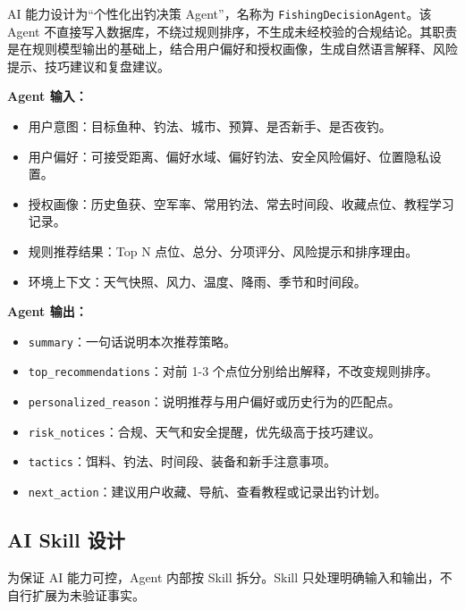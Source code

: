 AI 能力设计为“个性化出钓决策 Agent”，名称为 \texttt{FishingDecisionAgent}。该 Agent 不直接写入数据库，不绕过规则排序，不生成未经校验的合规结论。其职责是在规则模型输出的基础上，结合用户偏好和授权画像，生成自然语言解释、风险提示、技巧建议和复盘建议。

\textbf{Agent 输入：}

\begin{itemize}
  \item 用户意图：目标鱼种、钓法、城市、预算、是否新手、是否夜钓。
  \item 用户偏好：可接受距离、偏好水域、偏好钓法、安全风险偏好、位置隐私设置。
  \item 授权画像：历史鱼获、空军率、常用钓法、常去时间段、收藏点位、教程学习记录。
  \item 规则推荐结果：Top N 点位、总分、分项评分、风险提示和排序理由。
  \item 环境上下文：天气快照、风力、温度、降雨、季节和时间段。
\end{itemize}

\textbf{Agent 输出：}

\begin{itemize}
  \item \texttt{summary}：一句话说明本次推荐策略。
  \item \texttt{top\_recommendations}：对前 1-3 个点位分别给出解释，不改变规则排序。
  \item \texttt{personalized\_reason}：说明推荐与用户偏好或历史行为的匹配点。
  \item \texttt{risk\_notices}：合规、天气和安全提醒，优先级高于技巧建议。
  \item \texttt{tactics}：饵料、钓法、时间段、装备和新手注意事项。
  \item \texttt{next\_action}：建议用户收藏、导航、查看教程或记录出钓计划。
\end{itemize}

\subsection{AI Skill 设计}

为保证 AI 能力可控，Agent 内部按 Skill 拆分。Skill 只处理明确输入和输出，不自行扩展为未验证事实。

